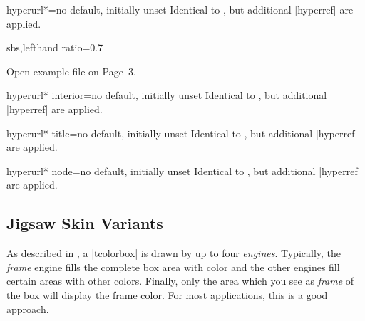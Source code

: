 \begin{docTcbKey}[][doc new=2017-02-03]{hyperurl*}{=}{no default, initially unset}
  Identical to , but additional |hyperref| \cite{rahtz:hyperref}
   are applied.
  \begin{dispExample*}{sbs,lefthand ratio=0.7}
\begin{tcolorbox}[enhanced,colback=green!50,
  hyperurl*={page=3,pdfnewwindow=true}%
            {tcolorbox-example.pdf}]
Open example file on Page~3.
\end{tcolorbox}
  \end{dispExample*}
\end{docTcbKey}

\begin{docTcbKey}[][doc new=2017-02-03]{hyperurl* interior}{=}{no default, initially unset}
  Identical to , but additional |hyperref| \cite{rahtz:hyperref}
   are applied.
\end{docTcbKey}

\begin{docTcbKey}[][doc new=2017-02-03]{hyperurl* title}{=}{no default, initially unset}
  Identical to , but additional |hyperref| \cite{rahtz:hyperref}
   are applied.
\end{docTcbKey}

\enlargethispage*{1cm}

\begin{docTcbKey}[][doc new=2017-02-03]{hyperurl* node}{=}{no default, initially unset}
  Identical to , but additional |hyperref| \cite{rahtz:hyperref}
   are applied.
\end{docTcbKey}



\clearpage
\subsection{Jigsaw Skin Variants}\label{subsec:skinjigsaw}
As described in , a |tcolorbox| is drawn by up to
four \emph{engines}. Typically, the \emph{frame} engine fills the complete box area
with color and the other engines fill certain areas with other colors.
Finally, only the area which you see as \emph{frame} of the box will display
the frame color. For most applications, this is a good approach.

